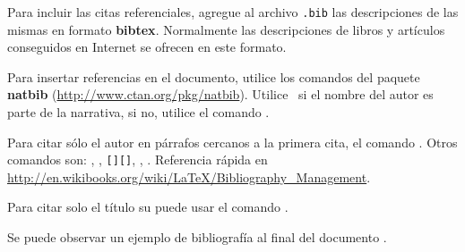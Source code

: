 
Para incluir las citas referenciales, agregue al archivo \texttt{.bib} las descripciones de las mismas en formato \textbf{bibtex}. Normalmente las descripciones de libros y artículos conseguidos en Internet se ofrecen en este formato.

Para insertar referencias en el documento, utilice los comandos del paquete \textbf{natbib} (\url{http://www.ctan.org/pkg/natbib}). Utilice \pa\ si el nombre del autor es parte de la narrativa, si no, utilice el comando \pa.

Para citar sólo el autor en párrafos cercanos a la primera cita, el comando \pa. Otros comandos son: , , \texttt{[][]}, , . Referencia rápida en \url{http://en.wikibooks.org/wiki/LaTeX/Bibliography_Management}.

Para citar solo el título su puede usar el comando .

Se puede observar un ejemplo de bibliografía al final del documento \citep{wikibib}.

